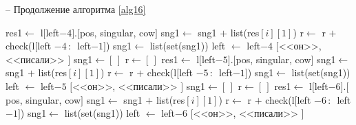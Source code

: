 \documentclass[main]{subfiles}
\begin{document}
\begin{algorithm}
	\caption{-- Продолжение алгоритма \ref{alg16}}\label{alg17}
	\begin{algorithmic}[1]
				\State res1$\gets$ l$[$left$-4]$.$[$pos, singular, cow$]$
		\State sng1$\gets$ sng1 $+$ list(res$[i][1]$)
		\State r$\gets$ r $+$ check(l$[$left $-4\, :\, $ left$-1 ]$)
		\EndIf
			\EndFor
		\State sng1$\gets$ list(set(sng1))
		\State left $\gets$ left$-4$
		\Else
		\State \Return $[$<<он>>, <<писали>> $]$
		\EndIf
		\State sng1$\gets [\, ]$
		\State r$\gets [\, ]$
		\State res1$\gets$ l$[$left$-5]$.$[$pos, singular, cow$]$
		\State sng1$\gets$ sng1 $+$ list(res$[i][1]$)
		\State r$\gets$ r $+$ check(l$[$left $-5\, :\, $ left$-1 ]$)
		\EndIf
		\EndFor
		\State sng1$\gets$ list(set(sng1))
		\State left $\gets$ left$-5$
		\Else
		\State \Return $[$<<он>>, <<писали>> $]$
		\EndIf
		\State sng1$\gets [\, ]$
		\State r$\gets [\, ]$
		\State res1$\gets$ l$[$left$-6]$.$[$pos, singular, cow$]$
		\State sng1$\gets$ sng1 $+$ list(res$[i][1]$)
		\State r$\gets$ r $+$ check(l$[$left $-6\, :\, $ left$-1 ]$)
		\EndIf
		\EndFor
		\State sng1$\gets$ list(set(sng1))
		\State left $\gets$ left$-6$
		\Else
				\State \Return $[$<<он>>, <<писали>> $]$
		\EndIf
	\end{algorithmic}
\end{algorithm}
\end{document}
